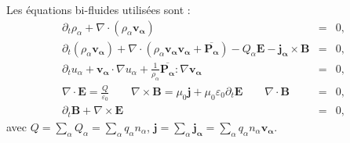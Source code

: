 Les équations bi-fluides utilisées
sont : 
\begin{eqnarray}
  \label{eq:model_bi_r} \partial_t \rho_{\alpha} + \nabla \cdot \left(\rho_{\alpha} \boldsymbol{v_{\alpha}}\right) &=& 0 ,\\
  \label{eq:model_bi_v} \partial_t \left(\rho_{\alpha} \boldsymbol{v_{\alpha}}\right) + \nabla \cdot \left(\rho_{\alpha} \boldsymbol{v_{\alpha}}\boldsymbol{v_{\alpha}} + \overline{\boldsymbol{P_{\alpha}}}\right) - Q_{\alpha} \boldsymbol{E} - \boldsymbol{j_{\alpha}} \times \boldsymbol{B} &=& 0 ,\\
  \label{eq:model_bi_u} \partial_t  u_{\alpha} + \boldsymbol{v_{\alpha}} \cdot \nabla u_{\alpha}   + \frac{1}{\rho_{\alpha}} \overline{\boldsymbol{P_{\alpha}}} : \nabla \boldsymbol{v_{\alpha}}   &=& 0 ,\\
\label{eq:model_bi_EB1} \nabla \cdot \boldsymbol{E} =  \frac{Q}{\varepsilon_0} \qquad \nabla \times \boldsymbol{B} = \mu_0  \boldsymbol{j} + \mu_0 \varepsilon_0 \partial_t \boldsymbol{E} \qquad \nabla \cdot \boldsymbol{B} &=& 0 , \\
\label{eq:model_bi_EB4}\partial_t \boldsymbol{B} + \nabla \times \boldsymbol{E}   &=&  0 ,
\end{eqnarray}
avec $Q = \sum_{\alpha} Q_{\alpha} =  \sum_{\alpha} q_{\alpha} n_{\alpha}$, $\boldsymbol{j} = \sum_{\alpha} \boldsymbol{j_{\alpha}} = \sum_{\alpha} q_{\alpha} n_{\alpha} \boldsymbol{v_{\alpha}}  $. 

